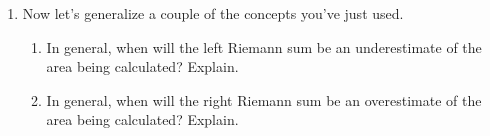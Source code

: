\documentclass[11pt,letterpaper]{article}
\begin{document}
\begin{enumerate}
	\item Now let's generalize a couple of the concepts you've just used. 
	\begin{enumerate}
	    \item In general, when will the left Riemann sum be an underestimate of the area being calculated? Explain. 
	    \item In general, when will the right Riemann sum be an overestimate of the area being calculated? Explain. 
	\end{enumerate}


\end{enumerate}
	
\end{document}
